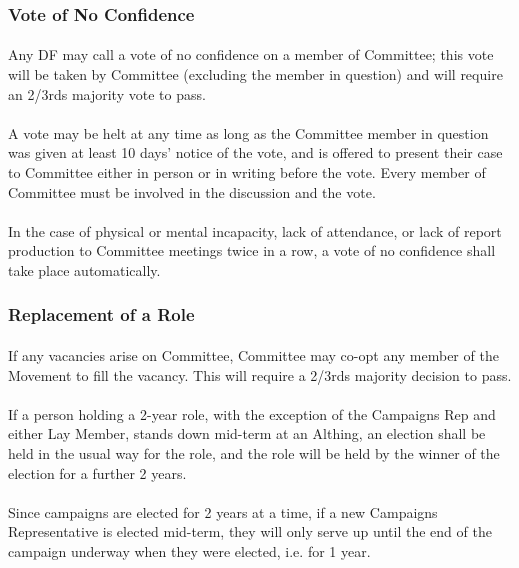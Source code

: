 \documentclass[a4paper, 12pt]{report}
\begin{document}
\subsubsection{Vote of No Confidence}
\label{sec:noconfidence}
\paragraph{} Any DF may call a vote of no confidence on a member of Committee; this vote will be taken by Committee (excluding the member in question) and will require an 2/3rds majority vote to pass.
\paragraph{} A vote may be helt at any time as long as the Committee member in question was given at least 10 days' notice of the vote, and is offered to present their case to Committee either in person or in writing before the vote. Every member of Committee must be involved in the discussion and the vote.
\paragraph{} In the case of physical or mental incapacity, lack of attendance, or lack of report production to Committee meetings twice in a row, a vote of no confidence shall take place automatically.
\subsubsection{Replacement of a Role}
\label{sec:rolereplacement}
\paragraph{} If any vacancies arise on Committee, Committee may co-opt any member of the Movement to fill the vacancy. This will require a 2/3rds majority decision to pass.
\paragraph{} If a person holding a 2-year role, with the exception of the Campaigns Rep and either Lay Member, stands down mid-term at an Althing, an election shall be held in the usual way for the role, and the role will be held by the winner of the election for a further 2 years.
\paragraph{} Since campaigns are elected for 2 years at a time, if a new Campaigns Representative is elected mid-term, they will only serve up until the end of the campaign underway when they were elected, i.e. for 1 year.
\end{document}
